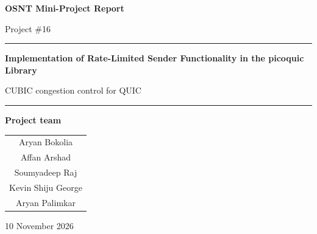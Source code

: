 \documentclass[12pt,a4paper]{article}
\begin{document}
\thispagestyle{empty}
\begin{center}
\vspace*{1.25cm}
{\Large\bfseries OSNT Mini-Project Report\par}
\vspace{0.3cm}
{\large Project \#16\par}
\vspace{0.8cm}
\rule{0.9\linewidth}{0.9pt}\par
\vspace{0.55cm}
{\fontsize{23}{28}\selectfont\bfseries Implementation of Rate-Limited Sender Functionality in the picoquic Library\par}
\vspace{0.35cm}
{\large CUBIC congestion control for QUIC\par}
\vspace{0.55cm}
\rule{0.9\linewidth}{0.45pt}\par
\vspace{1.3cm}
{\large\bfseries Project team\par}
\vspace{0.35cm}
{\large
\renewcommand{\arraystretch}{1.3}
\begin{tabular}{c}
Aryan Bokolia\\
Affan Arshad\\
Soumyadeep Raj\\
Kevin Shiju George\\
Aryan Palimkar
\end{tabular}\par}
\vfill
{\large 10 November 2026\par}
\vspace{1.2cm}
\end{center}









\end{document}
